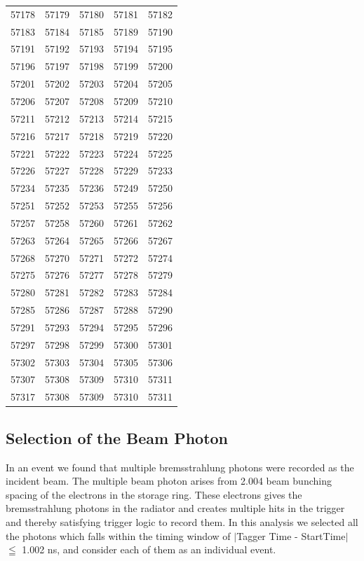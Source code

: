 \documentclass[12pt,a4paper]{amsbook}
\theoremstyle{definition}
\begin{document}
\begin{longtable}{|c|c|c|c|c|}
57178&57179&57180&57181&57182\\ 
57183&57184&57185&57189&57190\\ 
57191&57192&57193&57194&57195\\ 
57196&57197&57198&57199&57200\\ 
57201&57202&57203&57204&57205\\ 
57206&57207&57208&57209&57210\\ 
57211&57212&57213&57214&57215\\ 
57216&57217&57218&57219&57220\\ 
57221&57222&57223&57224&57225\\ 
57226&57227&57228&57229&57233\\ 
57234&57235&57236&57249&57250\\ 
57251&57252&57253&57255&57256\\ 
57257&57258&57260&57261&57262\\ 
57263&57264&57265&57266&57267\\ 
57268&57270&57271&57272&57274\\ 
57275&57276&57277&57278&57279\\ 
57280&57281&57282&57283&57284\\ 
57285&57286&57287&57288&57290\\ 
57291&57293&57294&57295&57296\\ 
57297&57298&57299&57300&57301\\ 
57302&57303&57304&57305&57306\\ 
57307&57308&57309&57310&57311\\ 
57317&57308&57309&57310&57311\\ 
\hline
\end{longtable}

\subsection{Selection of the Beam Photon}

In an event we found that multiple bremsstrahlung photons were recorded as the incident beam. The multiple beam photon arises from 2.004 beam bunching spacing of the electrons in the storage ring. These electrons gives the bremsstrahlung photons in the radiator and creates multiple hits in the trigger and thereby satisfying trigger logic to record them. In this analysis we selected all the  photons which falls within the timing window of $\mid$Tagger Time - StartTime$\mid$ $\leqq$ 1.002 ns, and consider each of them as an individual event.
\end{document}
